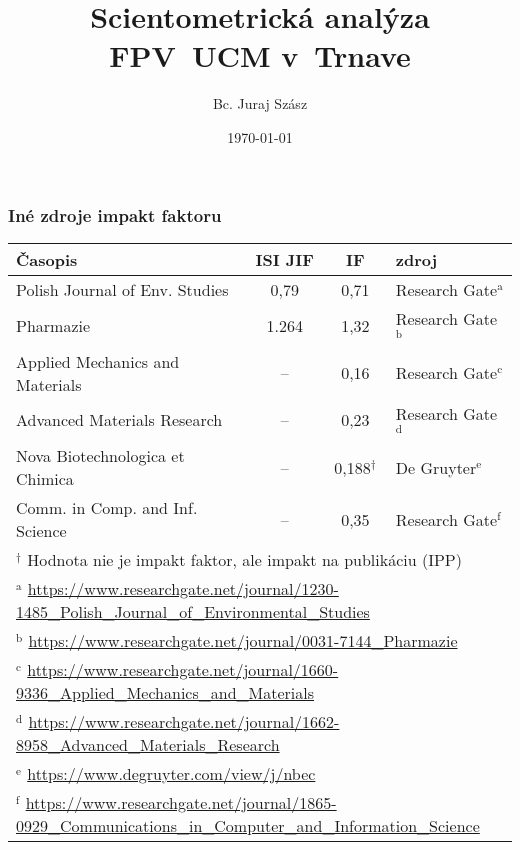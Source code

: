 \documentclass{beamer}
\author{Bc. Juraj Szász}
\title{Scientometrická analýza FPV~UCM v~Trnave}
\date{\today}
\begin{document}

\frame{\maketitle}

\frame{\tableofcontents}

\begin{frame}
  \frametitle{Iné zdroje impakt faktoru}
  {\small
  \begin{tabular}{lccl}
    \toprule
    Časopis & ISI JIF & IF & zdroj \\
    \midrule
    Polish Journal of Env. Studies  & 0,79  & 0,71           & Research Gate$^{\mathrm{a}}$ \\[0.5ex]
    Pharmazie                       & 1.264 & 1,32           & Research Gate$^{\mathrm{b}}$ \\[0.5ex]
    Applied Mechanics and Materials & --    & 0,16           & Research Gate$^{\mathrm{c}}$ \\[0.5ex]
    Advanced Materials Research     & --    & 0,23           & Research Gate$^{\mathrm{d}}$ \\[0.5ex]
    Nova Biotechnologica et Chimica & --    & 0,188$^\dagger$ & De Gruyter$^{\mathrm{e}}$    \\[0.5ex]
    Comm. in Comp. and Inf. Science & --    & 0,35           & Research Gate$^{\mathrm{f}}$ \\[0.5ex]
    \bottomrule
    \multicolumn{4}{l}{\tiny $^\dagger$ Hodnota nie je impakt faktor, ale impakt na publikáciu (IPP)} \\
    \multicolumn{4}{l}{\tiny $^{\mathrm{a}}$ \url{https://www.researchgate.net/journal/1230-1485\_Polish\_Journal\_of\_Environmental\_Studies}} \\
    \multicolumn{4}{l}{\tiny $^{\mathrm{b}}$ \url{https://www.researchgate.net/journal/0031-7144\_Pharmazie}} \\
    \multicolumn{4}{l}{\tiny $^{\mathrm{c}}$ \url{https://www.researchgate.net/journal/1660-9336\_Applied\_Mechanics\_and\_Materials}} \\
    \multicolumn{4}{l}{\tiny $^{\mathrm{d}}$ \url{https://www.researchgate.net/journal/1662-8958\_Advanced\_Materials\_Research}} \\
    \multicolumn{4}{l}{\tiny $^{\mathrm{e}}$ \url{https://www.degruyter.com/view/j/nbec}} \\
    \multicolumn{4}{l}{\tiny $^{\mathrm{f}}$ \url{https://www.researchgate.net/journal/1865-0929\_Communications\_in\_Computer\_and\_Information\_Science}} \\
  \end{tabular}}
\end{frame}

\end{document}
